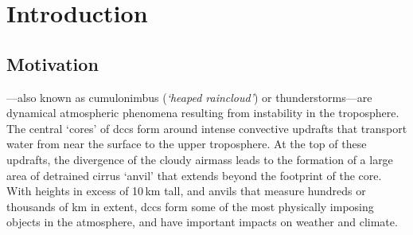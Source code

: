 \chapter{Introduction} \label{chp:introduction}

\section{Motivation}

---also known as cumulonimbus (\textit{`heaped raincloud'}) or thunderstorms---are dynamical atmospheric phenomena resulting from instability in the troposphere.
The central `cores' of \acrshort{dcc}s form around intense convective updrafts that transport water from near the surface to the upper troposphere.
At the top of these updrafts, the divergence of the cloudy airmass leads to the formation of a large area of detrained cirrus `anvil' that extends beyond the footprint of the core.
With heights in excess of 10\,\unit{km} tall, and anvils that measure hundreds or thousands of km in extent, \acrshort{dcc}s form some of the most physically imposing objects in the atmosphere, and have important impacts on weather and climate.

